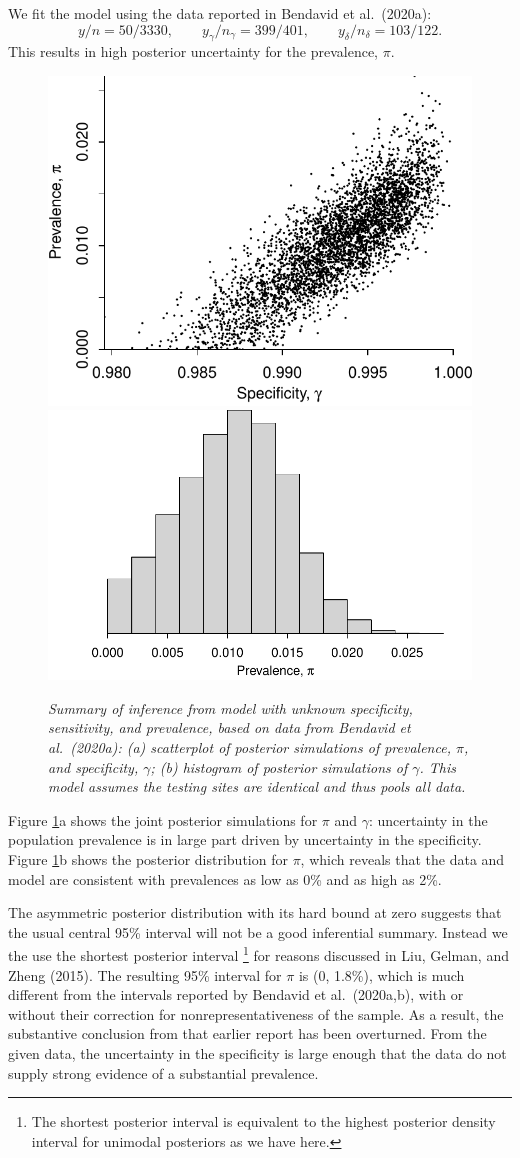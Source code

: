 \documentclass[11pt]{article}
\begin{document}
We fit the model using the data reported in Bendavid et al.\ (2020a):
%
\begin{equation*}
y/n=50/3330,\qquad  y_{\gamma}/n_{\gamma}=399/401, \qquad y_{\delta}/n_{\delta} =103/122.
\end{equation*}
%
This results in high posterior uncertainty for the prevalence, $\pi$.   
%
\begin{figure}
  \centerline{ \includegraphics[width=.45\textwidth]{img/scatter.pdf}
    \includegraphics[width=.55\textwidth]{img/hist.pdf}}
  \caption{\em Summary of inference from model with unknown
    specificity, sensitivity, and prevalence, based on data from
    Bendavid et al.\ (2020a): (a) scatterplot of posterior simulations
    of prevalence, $\pi$, and specificity, $\gamma$; (b) histogram of
    posterior simulations of $\gamma$.  This model assumes the testing
    sites are identical and thus pools all data.}
\label{posterior1}
\end{figure}
%
Figure \ref{posterior1}a shows the joint posterior simulations for
$\pi$ and $\gamma$: uncertainty in the
population prevalence is in large part driven by uncertainty in the
specificity.  Figure \ref{posterior1}b shows the posterior
distribution for $\pi$, which reveals that the data and model are
consistent with prevalences as low as 0\% and as high as 2\%.

The asymmetric posterior distribution with its hard bound at zero
suggests that the usual central 95\% interval will not be a good
inferential summary.  Instead we the use the shortest posterior
interval%
% 
\footnote{The shortest posterior interval is equivalent to the highest
  posterior density interval for unimodal posteriors as we have here.}
%
for reasons discussed in Liu, Gelman, and Zheng
(2015). The resulting 95\% interval for $\pi$ is (0, 1.8\%), which is
much different from the intervals reported by Bendavid et al.\
(2020a,b), with or without their correction for nonrepresentativeness
of the sample.  As a result, the substantive conclusion from that
earlier report has been overturned. From the given data, the
uncertainty in the specificity is large enough that the data do not
supply strong evidence of a substantial prevalence.
\end{document}
